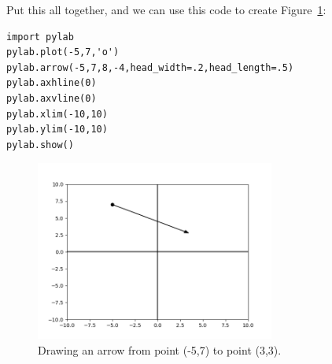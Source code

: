 Put this all together, and we can use this code to create
Figure~\ref{fig:firstArrow}:

\begin{Verbatim}[fontsize=\small,samepage=true,frame=single,framesep=3mm]
import pylab
pylab.plot(-5,7,'o')
pylab.arrow(-5,7,8,-4,head_width=.2,head_length=.5)
pylab.axhline(0)
pylab.axvline(0)
pylab.xlim(-10,10)
pylab.ylim(-10,10)
pylab.show()
\end{Verbatim}

\begin{figure}[ht]
\centering
\includegraphics[width=0.7\textwidth]{first_arrow.png}
\caption{Drawing an arrow from point (-5,7) to point (3,3).}
\label{fig:firstArrow}
\end{figure}


